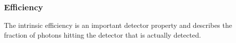 \subsubsection{Efficiency}
The intrinsic efficiency is an important detector property and describes the fraction of photons hitting the detector that is actually detected.
